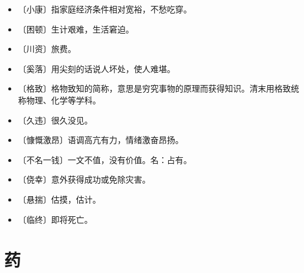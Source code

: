 \documentclass[12pt,UTF-8,openany]{ctexbook}
\begin{document}
\vspace{-1em}

\begin{itemize}
    \setlength\itemsep{-0.2em}
    \item 〔小康〕指家庭经济条件相对宽裕，不愁吃穿。
    \item 〔困顿〕生计艰难，生活窘迫。
    \item 〔川资〕旅费。
    \item 〔奚落〕用尖刻的话说人坏处，使人难堪。
    \item 〔格致〕格物致知的简称，意思是穷究事物的原理而获得知识。清末用格致统称物理、化学等学科。
    \item 〔久违〕很久没见。
    \item 〔慷慨激昂〕语调高亢有力，情绪激奋昂扬。
    \item 〔不名一钱〕一文不值，没有价值。名：占有。
    \item 〔侥幸〕意外获得成功或免除灾害。
    \item 〔悬揣〕估摸，估计。
    \item 〔临终〕即将死亡。
\end{itemize}

\chapter{药}
\end{document}
